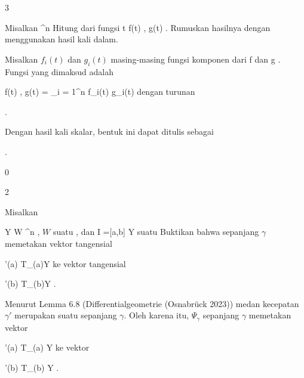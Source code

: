 {3}

{

Misalkan
 {\R} { \R^n
} {}
Hitung
dari fungsi
\maabbeledisp {} {\R} {\R
} { t } { \left\langle f(t) , g(t)  \right\rangle
} {.}
Rumuskan hasilnya dengan menggunakan hasil kali dalam.

}
{

Misalkan $f_i(t)$ dan $g_i(t)$ masing-masing fungsi komponen dari
\mathkor {} {f} {dan} {g} {.}
Fungsi yang dimaksud adalah

\mavergleichskettedisp
{\vergleichskette
{  \left\langle f(t) , g(t)  \right\rangle
}
{ =} { \sum_{i = 1}^n  f_i(t) g_i(t)
}
{ } {
}
{ } {
}
{ } {
}
}
{}{}{}
dengan turunan
 {} {}

 { . }

Dengan hasil kali skalar, bentuk ini dapat ditulis sebagai

 {  }

.

 }



{0}

{

}
{  }



{2}

{

Misalkan

\mavergleichskette
{\vergleichskette
{ Y
}
{ \subseteq }{ W
}
{ \subseteq }{ \R^n
}
{    }{
}
{   }{
}
}
{}{}{,}
$W$
suatu
,
dan
\maabb {\gamma} {I =[a,b]} {Y
} {}
suatu
Buktikan bahwa
sepanjang $\gamma$ memetakan vektor tangensial

\mavergleichskette
{\vergleichskette
{ \gamma'(a)
}
{ \in }{ T_{\gamma(a)}Y
}
{  }{
}
{    }{
}
{   }{
}
}
{}{}{}
ke vektor tangensial

\mavergleichskette
{\vergleichskette
{ \gamma'(b)
}
{ \in }{ T_{\gamma(b)}Y
}
{  }{
}
{    }{
}
{   }{
}
}
{}{}{.}

}
{

Menurut
Lemma 6.8 (Differentialgeometrie (Osnabrück 2023))
medan kecepatan $\gamma'$ merupakan suatu
sepanjang $\gamma$. Oleh karena itu,
$\Psi_\gamma$ sepanjang $\gamma$ memetakan vektor

\mavergleichskette
{\vergleichskette
{ \gamma'(a)
}
{ \in }{  T_{\gamma(a)} Y
}
{  }{
}
{    }{
}
{   }{
}
}
{}{}{}
ke vektor

\mavergleichskette
{\vergleichskette
{ \gamma'(b)
}
{ \in }{  T_{\gamma(b)} Y
}
{  }{
}
{    }{
}
{   }{
}
}
{}{}{}
.

 }



